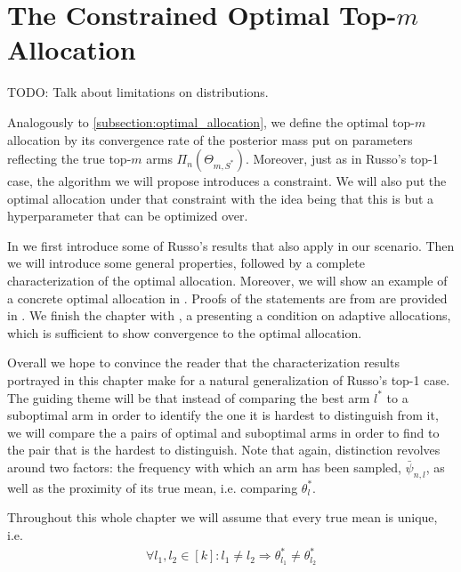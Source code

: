 \chapter{The Constrained Optimal Top-$m$ Allocation}

TODO: Talk about limitations on distributions.

Analogously to \ref{subsection:optimal_allocation}, we define the optimal top-$m$ allocation by its convergence rate of the posterior mass put on parameters reflecting the true top-$m$ arms $\Pi_n(\Theta_{m, S^*})$. Moreover, just as in Russo's top-1 case, the algorithm we will propose introduces a constraint. We will also put the optimal allocation under that constraint with the idea being that this is but a hyperparameter that can be optimized over.

In  we first introduce some of Russo's results that also apply in our scenario. Then we will introduce some general properties, followed by a complete characterization of the optimal allocation. Moreover, we will show an example of a concrete optimal allocation in . Proofs of the statements are from  are provided in . We finish the chapter with , a presenting a condition on adaptive allocations, which is sufficient to show convergence to the optimal allocation.

Overall we hope to convince the reader that the characterization results portrayed in this chapter make for a natural generalization of Russo's top-1 case. The guiding theme will be that instead of comparing the best arm $l^*$ to a suboptimal arm in order to identify the one it is hardest to distinguish from it, we will compare the a pairs of optimal and suboptimal arms in order to find to the pair that is the hardest to distinguish. Note that again, distinction revolves around two factors: the frequency with which an arm has been sampled, $\bar{\psi}_{n, l}$, as well as the proximity of its true mean, i.e. comparing $\theta^*_l$.

Throughout this whole chapter we will assume that every true mean is unique, i.e.
\begin{align}
  \forall l_1, l_2 \in [k]: l_1 \neq l_2 \Rightarrow \theta^*_{l_1} \neq \theta^*_{l_2}
\end{align}



